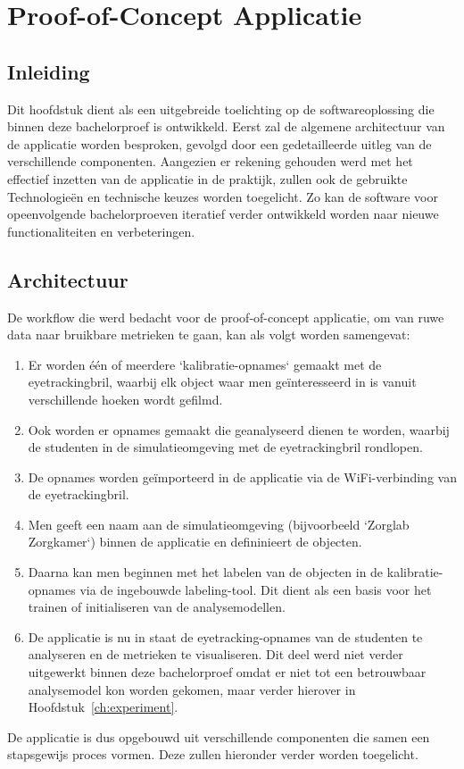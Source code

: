 \chapter{Proof-of-Concept Applicatie}
\label{ch:ontwikkeling}

\section{Inleiding}

Dit hoofdstuk dient als een uitgebreide toelichting op de softwareoplossing die binnen deze bachelorproef is ontwikkeld.
Eerst zal de algemene architectuur van de applicatie worden besproken, gevolgd door een gedetailleerde uitleg van de verschillende componenten.
Aangezien er rekening gehouden werd met het effectief inzetten van de applicatie in de praktijk, zullen ook de gebruikte Technologieën en technische keuzes worden toegelicht.
Zo kan de software voor opeenvolgende bachelorproeven iteratief verder ontwikkeld worden naar nieuwe functionaliteiten en verbeteringen.

\section{Architectuur}

De workflow die werd bedacht voor de proof-of-concept applicatie, om van ruwe data naar bruikbare metrieken te gaan, kan als volgt worden samengevat:
\begin{enumerate}
    \item Er worden één of meerdere `kalibratie-opnames` gemaakt met de eyetrackingbril, waarbij elk object waar men geïnteresseerd in is vanuit verschillende hoeken wordt gefilmd.
    \item Ook worden er opnames gemaakt die geanalyseerd dienen te worden, waarbij de studenten in de simulatieomgeving met de eyetrackingbril rondlopen.
    \item De opnames worden geïmporteerd in de applicatie via de WiFi-verbinding van de eyetrackingbril.
    \item Men geeft een naam aan de simulatieomgeving (bijvoorbeeld `Zorglab Zorgkamer`) binnen de applicatie en defininieert de objecten.
    \item Daarna kan men beginnen met het labelen van de objecten in de kalibratie-opnames via de ingebouwde labeling-tool. Dit dient als een basis voor het trainen of initialiseren van de analysemodellen.
    \item De applicatie is nu in staat de eyetracking-opnames van de studenten te analyseren en de metrieken te visualiseren. Dit deel werd niet verder uitgewerkt binnen deze bachelorproef omdat er niet tot een betrouwbaar analysemodel kon worden gekomen, maar verder hierover in Hoofdstuk~\ref{ch:experiment}.
\end{enumerate}
De applicatie is dus opgebouwd uit verschillende componenten die samen een stapsgewijs proces vormen. Deze zullen hieronder verder worden toegelicht.

